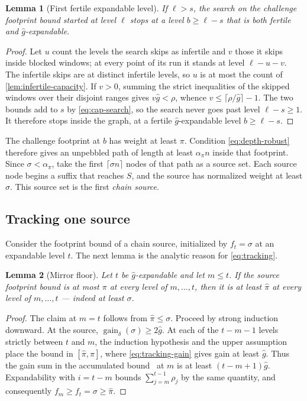\documentclass[11pt]{article}
\theoremstyle{plain}
\newtheorem{lemma}{Lemma}
\theoremstyle{remark}
\newcommand{\gaind}{\operatorname{gain}_{\delta}}
\newcommand{\ghat}{\widehat g}
\newcommand{\pihat}{\widehat{\pi}}
\newcommand{\spend}[2]{\sum_{j=#1}^{#2}\rho_j}
\begin{document}
\begin{lemma}[First fertile expandable level]
\label{lem:first-source}
If \(\ell>s\), the search on the challenge footprint bound started at level \(\ell\)
stops at a level \(b\ge\ell-s\) that is both fertile and \(\ghat\)-expandable.
\end{lemma}

\begin{proof}
Let \(u\) count the levels the search skips as infertile and \(v\) those it skips
inside blocked windows; at every point of its run it stands at level \(\ell-u-v\).
The infertile skips are at distinct infertile levels, so \(u\) is at most the count of
\cref{lem:infertile-capacity}.  If \(v>0\), summing the strict inequalities of
the skipped windows over their disjoint ranges gives \(v\ghat<\rho\), whence
\(v\le\lceil\rho/\ghat\rceil-1\).  The two bounds add to \(s\) by
\eqref{eq:cap-search}, so the search never goes past level \(\ell-s\ge1\).  It
therefore stops inside the graph, at a fertile \(\ghat\)-expandable level
\(b\ge\ell-s\).
\end{proof}

The challenge footprint at \(b\) has weight at least \(\pi\).  Condition
\eqref{eq:depth-robust} therefore gives an unpebbled
path of length at least \(\alpha_\pi n\) inside that footprint.  Since
\(\sigma<\alpha_\pi\), take the first \(\lceil\sigma n\rceil\) nodes of that
path as a source set.  Each source node begins a suffix that reaches \(S\), and the
source has normalized weight at least \(\sigma\).  This source set is the first
\emph{chain source}.

\subsection{Tracking one source}

Consider the footprint bound of a chain source, initialized by \(f_t=\sigma\) at an
expandable level \(t\).  The next lemma is the analytic reason for
\eqref{eq:tracking}.

\begin{lemma}[Mirror floor]
\label{lem:mirror-floor}
Let \(t\) be \(\ghat\)-expandable and let \(m\le t\).  If the source footprint
bound is at most \(\pi\) at every level of \(m,\ldots,t\), then it is at least
\(\pihat\) at every level of \(m,\ldots,t\) --- indeed at least \(\sigma\).
\end{lemma}

\begin{proof}
The claim at \(m=t\) follows from \(\pihat\le\sigma\).  Proceed by strong induction
downward.  At the source, \(\gaind(\sigma)\ge2\ghat\).  At each of the \(t-m-1\)
levels strictly between \(t\) and \(m\), the induction hypothesis and the upper
assumption place the bound in \([\pihat,\pi]\), where \eqref{eq:tracking-gain} gives
gain at least \(\ghat\).  Thus the gain sum in the accumulated
bound~\cite[Claim 3]{FOCS:Reyzin24} at \(m\) is at least
\((t-m+1)\ghat\).  Expandability with \(i=t-m\) bounds
\(\spend{m}{t-1}\) by the same quantity, and consequently
\(f_m\ge f_t=\sigma\ge\pihat\).
\end{proof}
\end{document}
